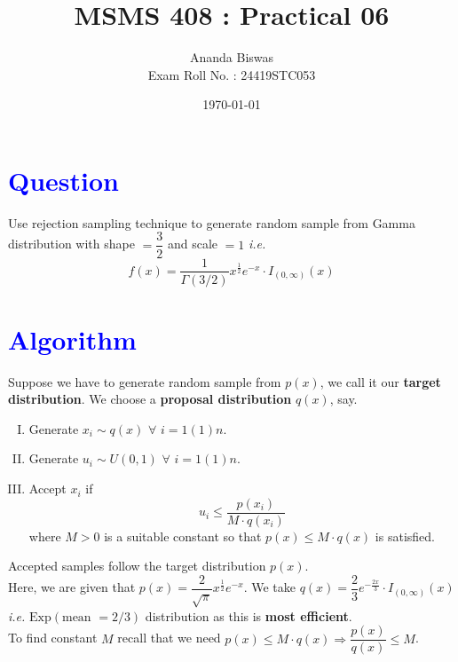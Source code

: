 \documentclass[11pt, a4paper]{article}\usepackage[]{graphicx}\usepackage[]{xcolor}
\title{MSMS 408 : Practical 06}
\author{Ananda Biswas \\[1em] Exam Roll No. : 24419STC053}
\date{\today}
\begin{document}
\maketitle


\section*{\faArrowAltCircleRight[regular] \textcolor{blue}{Question}}

\hspace{1cm} Use rejection sampling technique to generate random sample from Gamma distribution with shape $= \dfrac{3}{2}$ and scale $= 1$ \textit{i.e.}
\begin{equation*}
f(x) = \dfrac{1}{\Gamma(3/2)} x^{\frac{1}{2}}e^{-x} \cdot I_{(0, \infty)}(x)
\end{equation*}

\section*{\faArrowAltCircleRight[regular] \textcolor{blue}{Algorithm}}

Suppose we have to generate random sample from $p(x)$, we call it our \textbf{target distribution}. We choose a \textbf{proposal distribution} $q(x)$, say.

\begin{enumerate}[I.]
\item Generate $x_i \sim q(x)$ $\forall$ $i = 1(1)n$.
\item Generate $u_i \sim U(0, 1)$ $\forall$ $i = 1(1)n$.
\item Accept $x_i$ if $$u_i \leq \dfrac{p(x_i)}{M \cdot q(x_i)}$$ where $M > 0$ is a suitable constant so that $p(x) \leq M \cdot q(x)$ is satisfied.
\end{enumerate}

Accepted samples follow the target distribution $p(x)$. \\[0.2em]

Here, we are given that $p(x) = \dfrac{2}{\sqrt{\pi}} x^{\frac{1}{2}}e^{-x}$. We take $q(x) = \dfrac{2}{3} e^{-\frac{2x}{3}} \cdot I_{(0, \infty)}(x)$ \textit{i.e.} $\text{Exp}(\text{mean } = 2/3)$ distribution as this is \textbf{most efficient}. \\[0.2em]

To find constant $M$ recall that we need $p(x) \leq M \cdot q(x) \Rightarrow \dfrac{p(x)}{q(x)} \leq M$. \\[0.2em]
\end{document}
